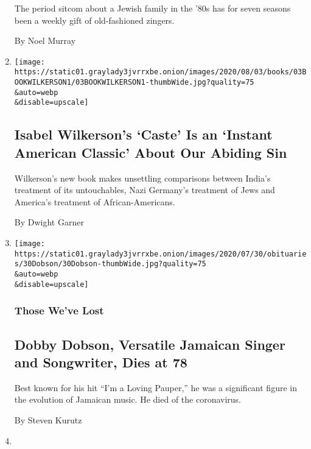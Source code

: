 \begin{enumerate}
  The period sitcom about a Jewish family in the '80s has for seven
  seasons been a weekly gift of old-fashioned zingers.

  By Noel Murray
\item
  \href{/2020/07/31/books/review-caste-isabel-wilkerson-origins-of-our-discontents.html}{}

  \texttt{[image: https://static01.graylady3jvrrxbe.onion/images/2020/08/03/books/03BOOKWILKERSON1/03BOOKWILKERSON1-thumbWide.jpg?quality=75\\\&auto=webp\\\&disable=upscale]}

  \hypertarget{isabel-wilkersons-caste-is-an-instant-american-classic-about-our-abiding-sin}{%
  \subsection{Isabel Wilkerson's `Caste' Is an `Instant American
  Classic' About Our Abiding
  Sin}\label{isabel-wilkersons-caste-is-an-instant-american-classic-about-our-abiding-sin}}

  Wilkerson's new book makes unsettling comparisons between India's
  treatment of its untouchables, Nazi Germany's treatment of Jews and
  America's treatment of African-Americans.

  By Dwight Garner
\item
  \href{/2020/07/31/obituaries/dobby-dobson-dead-coronavirus.html}{}

  \texttt{[image: https://static01.graylady3jvrrxbe.onion/images/2020/07/30/obituaries/30Dobson/30Dobson-thumbWide.jpg?quality=75\\\&auto=webp\\\&disable=upscale]}

  \hypertarget{those-weve-lost}{%
  \subsubsection{Those We've Lost}\label{those-weve-lost}}

  \hypertarget{dobby-dobson-versatile-jamaican-singer-and-songwriter-dies-at-78}{%
  \subsection{Dobby Dobson, Versatile Jamaican Singer and Songwriter,
  Dies at
  78}\label{dobby-dobson-versatile-jamaican-singer-and-songwriter-dies-at-78}}

  Best known for his hit ``I'm a Loving Pauper,'' he was a significant
  figure in the evolution of Jamaican music. He died of the coronavirus.

  By Steven Kurutz
\item
  \href{/2020/07/31/theater/the-7th-voyage-of-egon-tichy-review.html}{}


\end{enumerate}
